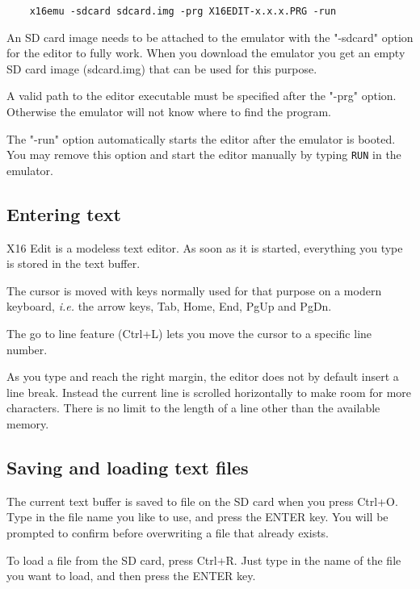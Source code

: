 \documentclass{article}
\begin{document}
\begin{verbatim}
    x16emu -sdcard sdcard.img -prg X16EDIT-x.x.x.PRG -run
\end{verbatim}
        An SD card image needs to be attached to the
        emulator with the "-sdcard" option for the editor to
        fully work. When you download the emulator you get an empty SD card
        image (sdcard.img) that can be used for this purpose.
 
        A valid path to the editor executable must be specified after
        the "-prg" option. Otherwise the emulator will not know where
        to find the program.
 
        The "-run" option automatically starts the editor after the emulator
        is booted. You may remove this option and start the editor manually
        by typing \texttt{RUN} in the emulator.
 
    \subsection{Entering text}
        X16 Edit is a modeless text editor. As soon as it is started, everything
        you type is stored in the text buffer.
 
        The cursor is moved with keys normally used for that purpose on a modern
        keyboard, \textit{i.e.} the arrow keys, Tab, Home, End, PgUp and PgDn.

        The go to line feature (Ctrl+L) lets you move the cursor to a specific line number.
 
        As you type and reach the right margin, the editor does not by default insert a line break. 
        Instead the current line is scrolled horizontally to
        make room for more characters. There is no limit to the length of a line
        other than the available memory.
 
    \subsection{Saving and loading text files}
        The current text buffer is saved to file on the SD card when you press Ctrl+O. Type in the 
        file name you like to use, and press the ENTER key. You will
        be prompted to confirm before overwriting a file that already exists.
         
        To load a file from the SD card, press Ctrl+R. 
        Just type in the name of the file you want to load, and then press the ENTER key.
        
\end{document}
